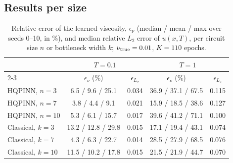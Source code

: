 \documentclass[floatfix,aps,pra,twocolumn,showpacs,superscriptaddress,10pt,nofootinbib]{revtex4-2}
\begin{document}
\begin{appendices}
\section{Results per size}\label{app:seeds}
\begin{table}[h]
\caption{\justifying Relative error of the learned viscosity, $\epsilon_\nu$ (median / mean / max over seeds 0--10, in \%), and median relative $L_2$ error of $u(x,T)$, per circuit size $n$ or bottleneck width $k$; $\nu_{\rm true}=0.01$, $K=110$ epochs.}
\label{tab:seeds}
\setlength{\tabcolsep}{3pt}
\footnotesize
\begin{ruledtabular}
\begin{tabular}{lcccc}
 & \multicolumn{2}{c}{$T=0.1$} & \multicolumn{2}{c}{$T=1$}\\
\cline{2-3}\cline{4-5}
 & $\epsilon_\nu$ (\%) & $\epsilon_{L_2}$ & $\epsilon_\nu$ (\%) & $\epsilon_{L_2}$\\
\colrule
HQPINN, $n=3$     & 6.5 / 9.6 / 25.1  & 0.034 & 36.9 / 37.1 / 67.5 & 0.115\\
HQPINN, $n=7$     & 3.8 / 4.4 / 9.1   & 0.021 & 15.9 / 18.5 / 38.6 & 0.127\\
HQPINN, $n=10$    & 5.3 / 6.1 / 15.7  & 0.017 & 39.6 / 41.2 / 71.1 & 0.100\\
\colrule
Classical, $k=3$  & 13.2 / 12.8 / 29.8 & 0.015 & 17.1 / 19.4 / 43.1 & 0.074\\
Classical, $k=7$  & 4.3 / 6.3 / 22.7   & 0.014 & 28.5 / 27.9 / 68.5 & 0.076\\
Classical, $k=10$ & 11.5 / 10.2 / 17.8 & 0.015 & 21.5 / 21.9 / 44.7 & 0.070\\
\end{tabular}
\end{ruledtabular}
\end{table}
\end{appendices}


\end{document}
